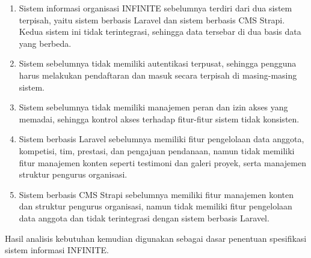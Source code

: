 \begin{enumerate}
      \item Sistem informasi organisasi INFINITE sebelumnya terdiri dari dua sistem terpisah, yaitu sistem berbasis Laravel dan sistem berbasis CMS Strapi. Kedua sistem ini tidak terintegrasi, sehingga data tersebar di dua basis data yang berbeda.
      \item Sistem sebelumnya tidak memiliki autentikasi terpusat, sehingga pengguna harus melakukan pendaftaran dan masuk secara terpisah di masing-masing sistem.
      \item Sistem sebelumnya tidak memiliki manajemen peran dan izin akses yang memadai, sehingga kontrol akses terhadap fitur-fitur sistem tidak konsisten.
      \item Sistem berbasis Laravel sebelumnya memiliki fitur pengelolaan data anggota, kompetisi, tim, prestasi, dan pengajuan pendanaan, namun tidak memiliki fitur manajemen konten seperti testimoni dan galeri proyek, serta manajemen struktur pengurus organisasi.
      \item Sistem berbasis CMS Strapi sebelumnya memiliki fitur manajemen konten dan struktur pengurus organisasi, namun tidak memiliki fitur pengelolaan data anggota dan tidak terintegrasi dengan sistem berbasis Laravel.
\end{enumerate}

Hasil analisis kebutuhan kemudian digunakan sebagai dasar penentuan spesifikasi sistem informasi INFINITE.

